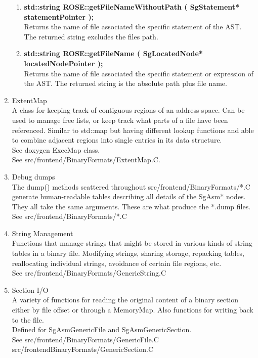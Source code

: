 \begin{enumerate}
\begin{enumerate}
      \item {\bf std::string ROSE::getFileNameWithoutPath ( SgStatement* statementPointer );} \\
      Returns the name of file associated the specific statement of the AST. The returned
      string excludes the files path.

      \item {\bf std::string ROSE::getFileName ( SgLocatedNode* locatedNodePointer );} \\
      Returns the name of file associated the specific statement or expression of the AST.
      The returned string is the absolute path plus file name.
   \end{enumerate}

   \item ExtentMap \\
   A class for keeping track of contiguous regions of an address
   space. Can be used to manage free lists, or keep track what
   parts of a file have been referenced. Similar to std::map but
   having different lookup functions and able to combine adjacent
   regions into single entries in its data structure. \\
   See doxygen ExecMap class. \\
   See src/frontend/BinaryFormats/ExtentMap.C.

   \item Debug dumps \\
   The dump() methods scattered throughout
   src/frontend/BinaryFormats/*.C generate human-readable tables
   describing all details of the SgAsm* nodes. They all take the
   same arguments. These are what produce the *.dump files. \\
   See src/frontend/BinaryFormats/*.C

   \item String Management \\
   Functions that manage strings that might be stored in various
   kinds of string tables in a binary file.  Modifying strings,
   sharing storage, repacking tables, reallocating individual
   strings, avoidance of certain file regions, etc. \\
   See src/frontend/BinaryFormats/GenericString.C

   \item Section I/O \\
   A variety of functions for reading the original content of a
   binary section either by file offset or through a
   MemoryMap. Also functions for writing back to the file. \\
   Defined for SgAsmGenericFile and SgAsmGenericSection. \\
   See src/frontend/BinaryFormats/GenericFile.C src/frontendBinaryFormats/GenericSection.C


\end{enumerate}
